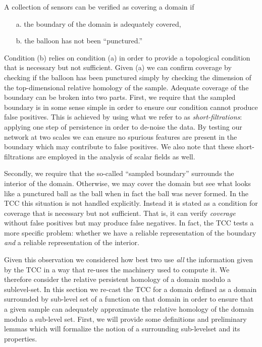 
A collection of sensors can be verified as covering a domain if
\begin{enumerate}
    \item[a.] the boundary of the domain is adequately covered,
    \item[b.] the balloon has not been ``punctured.''
\end{enumerate}
Condition (b) relies on condition (a) in order to provide a topological condition that is necessary but not sufficient.
Given (a) we can confirm coverage by checking if the balloon has been punctured simply by checking the dimension of the top-dimensional relative homology of the sample.
Adequate coverage of the boundary can be broken into two parts.
First, we require that the sampled boundary is in some sense simple in order to ensure our condition cannot produce false positives.
This is achieved by using what we refer to as \emph{short-filtrations}: applying one step of persistence in order to de-noise the data.
By testing our network at two scales we can ensure no spurious features are present in the boundary which may contribute to false positives.
We also note that these short-filtrations are employed in the analysis of scalar fields as well.

Secondly, we require that the so-called ``sampled boundary'' surrounds the interior of the domain.
Otherwise, we may cover the domain but see what looks like a punctured ball as the ball when in fact the ball was never formed.
In the TCC this situation is not handled explicitly.
Instead it is stated as a condition for coverage that is necessary but not sufficient.
That is, it can verify \emph{coverage} without false positives but may produce false negatives.
In fact, the TCC tests a more specific problem: whether we have a reliable representation of the boundary \emph{and} a reliable representation of the interior.



Given this observation we considered how best two use \emph{all} the information given by the TCC in a way that re-uses the machinery used to compute it.
We therefore consider the relative persistent homology of a domain modulo a sublevel-set.
In this section we re-cast the TCC for a domain defined as a domain surrounded by sub-level set of a function on that domain in order to ensure that a given sample can adequately approximate the relative homology of the domain modulo a sub-level set.
First, we will provide some definitions and preliminary lemmas which will formalize the notion of a surrounding sub-levelset and its properties.

